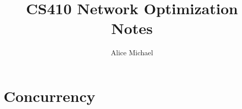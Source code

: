 \chead{}
\author{Alice Michael}
\title{CS410 Network Optimization Notes}
\date{}






\section*{Concurrency}


